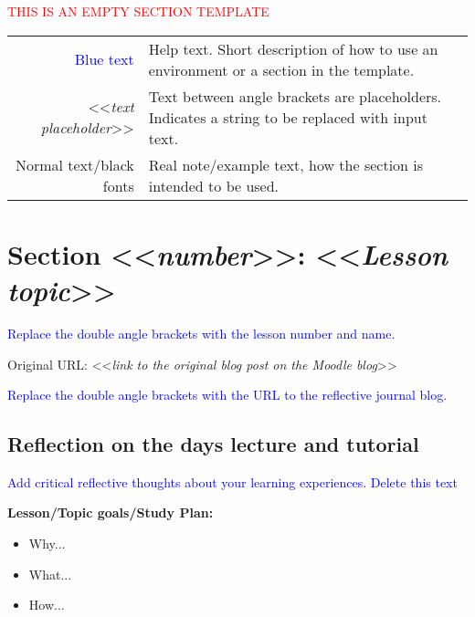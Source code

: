 

{\begin{center}
    \textcolor{red}{\Huge{THIS IS AN EMPTY SECTION TEMPLATE}}

    \begin{tabular}{r @{: } p{80mm}}
        {\textcolor{blue}{Blue text}} &  Help text. Short description of how to use an environment or a section in the template.\\
        <<{\emph{text placeholder}}>> & Text between angle brackets are placeholders. Indicates a string to be replaced with input text.\\
        Normal text/black fonts & Real note/example text, how the section is intended to be used.
    \end{tabular}

\end{center}


\section{Section <<{\emph{number}}>>: <<{\emph{Lesson topic}}>>}

{\textcolor{blue}{Replace the double angle brackets with the lesson number and name.}}

Original URL: <<{\emph{link to the original blog post on the Moodle blog}}>>

{\textcolor{blue}{Replace the double angle brackets with the URL to the reflective journal blog.}}


\subsection{Reflection on the days lecture and tutorial}

{\textcolor{blue}{Add critical reflective thoughts about your learning experiences. Delete this text}}

{\bfseries{Lesson/Topic goals/Study Plan:}}
\begin{itemize}\itshape
    \item Why...
    \item What...
    \item How...
\end{itemize}

}
